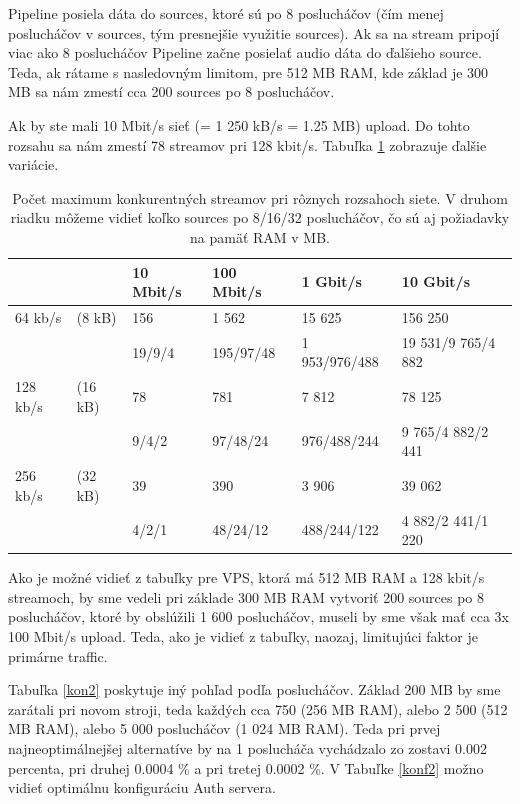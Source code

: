 \documentclass[11pt]{article}
\begin{document}
Pipeline posiela dáta do sources, ktoré sú po 8 poslucháčov (čím menej poslucháčov v sources, tým presnejšie využitie sources). Ak sa na stream pripojí viac ako 8 poslucháčov Pipeline začne posielať audio dáta do ďalšieho source. Teda, ak rátame s nasledovným limitom, pre 512 MB RAM, kde základ je 300 MB sa nám zmestí cca 200 sources po 8 poslucháčov.

Ak by ste mali 10 Mbit/s sieť (= 1 250 kB/s = 1.25 MB) upload. Do tohto rozsahu sa nám zmestí 78 streamov pri 128 kbit/s. Tabuľka \ref{kon} zobrazuje ďalšie variácie.

\begin{table}[htp]
\centering
\begin{tabular}{|ll|l|l|l|l|}
\hline
	           & & 10 Mbit/s & 100 Mbit/s & 1 Gbit/s & 10 Gbit/s \\
\hline
	64 kb/s  & (8 kB) & 156   & 1 562     & 15 625   & 156 250\\
	
	           &          & 19/9/4 & 195/97/48 & 1 953/976/488  & 19 531/9 765/4 882\\
\hline
	128 kb/s & (16 kB) & 78        & 781        & 7 812    & 78 125 \\
	           &          & 9/4/2 & 97/48/24 & 976/488/244  & 9 765/4 882/2 441\\
\hline
	256 kb/s & (32 kB) & 39       & 390        & 3 906    & 39 062\\
	           &       & 4/2/1 & 48/24/12 & 488/244/122  & 4 882/2 441/1 220\\
\hline
\end{tabular}
\caption{Počet maximum konkurentných streamov pri rôznych rozsahoch siete. V druhom riadku môžeme vidieť koľko sources po 8/16/32 poslucháčov, čo sú aj požiadavky na pamäť RAM v MB.}
\label{kon}
\end{table}

Ako je možné vidieť z tabuľky pre VPS, ktorá má 512 MB RAM a 128 kbit/s streamoch, by sme vedeli pri základe 300 MB RAM vytvoriť 200 sources po 8 poslucháčov, ktoré by obslúžili 1 600 poslucháčov, museli by sme však mať cca 3x 100 Mbit/s upload. Teda, ako je vidieť z tabuľky, naozaj, limitujúci faktor je primárne traffic.

Tabuľka \ref{kon2} poskytuje iný pohľad podľa poslucháčov. Základ 200 MB by sme zarátali pri novom stroji, teda každých cca 750 (256 MB RAM), alebo 2 500 (512 MB RAM), alebo 5 000 poslucháčov (1 024 MB RAM). Teda pri prvej najneoptimálnejšej alternatíve by na 1 poslucháča vychádzalo zo zostavi 0.002 percenta, pri druhej 0.0004 \% a pri tretej 0.0002 \%. V Tabuľke \ref{konf2} možno vidieť optimálnu konfiguráciu Auth servera.
\end{document}
